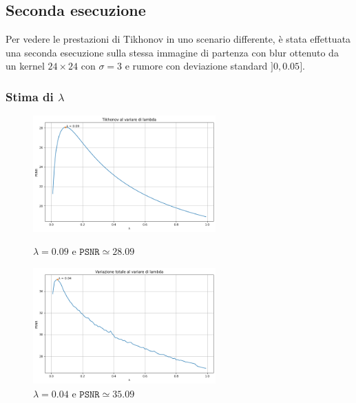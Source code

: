 \documentclass[11pt]{article}
\begin{document}
\subsection{Seconda esecuzione}
Per vedere le prestazioni di Tikhonov in uno scenario differente, è stata effettuata una seconda esecuzione sulla stessa immagine di partenza con blur ottenuto da un kernel $24 \times 24$ con $\sigma=3$ e rumore con deviazione standard $]0, 0.05]$.

\subsubsection{Stima di $\lambda$}
\begin{figure}[H]
    \centering
    \begin{minipage}{0.45\textwidth}
        \centering
        \includegraphics[width=7cm]{esecuzione/2/tikhonov_lambda.png}
        \caption{$\lambda=0.09$ e $\texttt{PSNR} \simeq 28.09$}
        \label{fig:tikhonov_lambda2}
    \end{minipage}\hfill
    \begin{minipage}{0.45\textwidth}
        \centering
        \includegraphics[width=7cm]{esecuzione/2/tv_lambda.png}
        \caption{$\lambda=0.04$ e $\texttt{PSNR} \simeq 35.09$}
        \label{fig:tv_lambda2}
    \end{minipage}
\end{figure}
\end{document}
